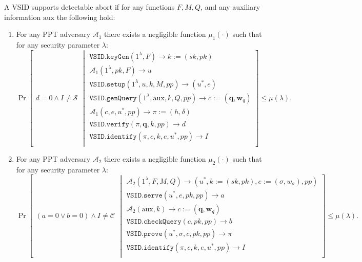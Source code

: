 \begin{definition}\label{def::VSID-Identifiable-Abort}  A  VSID  supports  detectable abort if for any  functions $F, M,Q$, and any auxiliary information $\text{aux}$ the following hold: 

\begin{enumerate}
\item For any PPT adversary $\mathcal{A}_{\scriptscriptstyle 1}$ there exists a negligible function $\mu_{\scriptscriptstyle 1}(\cdot)$ such that for any  security parameter $\lambda$:
{\small
$$ \Pr\left[
  \begin{array}{l}
 d=0 \wedge I\neq\mathcal{S}
\end{array} \middle |
    \begin{array}{l}
    \mathtt{VSID.keyGen}(1^{\lambda},F)\rightarrow k:=(sk,pk)\\
    \mathcal{A}_{\scriptscriptstyle 1}(1^{\scriptscriptstyle\lambda},pk, F)\rightarrow u\\
    \mathtt{VSID.setup}(1^{\lambda}, u, k, M,{pp})\rightarrow (u^{\scriptscriptstyle *},e)\\
    \mathtt{VSID.genQuery}(1^{\lambda},  \text{aux},k,Q,{pp})\rightarrow c:=(\bm{q}, \bm{w}_{q})\\
     \mathcal{A}_{\scriptscriptstyle 1}(c,e, u^{\scriptscriptstyle *},{pp})\rightarrow \pi:=(h,\delta)\\
     \mathtt{VSID.verify}(\pi,\bm{q},k,{pp})\rightarrow d\\
     \mathtt{VSID.identify}(\pi,c,k,e,u^{\scriptscriptstyle *},{pp})\rightarrow I\\
\end{array}    \right]\leq \mu(\lambda).$$
}

\item For any PPT adversary $\mathcal{A}_{\scriptscriptstyle 2}$ there exists a negligible function $\mu_{\scriptscriptstyle 2}(\cdot)$ such that for any  security parameter $\lambda$:
{\small
$$ \Pr\left[
  \begin{array}{l}
 (a=0 \vee b=0)\wedge I\neq\mathcal{C}
\end{array} \middle |
    \begin{array}{l}
    
    \mathcal{A}_{\scriptscriptstyle 2}(1^{\scriptscriptstyle\lambda},F,M,Q)\rightarrow (u^{\scriptscriptstyle *},k:=(sk,pk),e:=(\sigma,w_{\sigma}),{pp})\\
    \mathtt{VSID.serve}(u^{\scriptscriptstyle *},e,pk,{pp})\rightarrow a\\
       \mathcal{A}_{\scriptscriptstyle 2}(\text{aux},k)\rightarrow c:=(\bm{q},\bm{w}_{\scriptscriptstyle q})\\
    \mathtt{VSID.checkQuery}(c, pk,{pp})\rightarrow b\\
    \mathtt{VSID.prove}(u^{\scriptscriptstyle *},\sigma,c,pk,{pp})\rightarrow \pi\\
    \mathtt{VSID.identify}(\pi,c,k,e,u^{\scriptscriptstyle *},{pp})\rightarrow I\\
\end{array}    \right]\leq \mu(\lambda).$$
}


\end{enumerate}
\end{definition}
